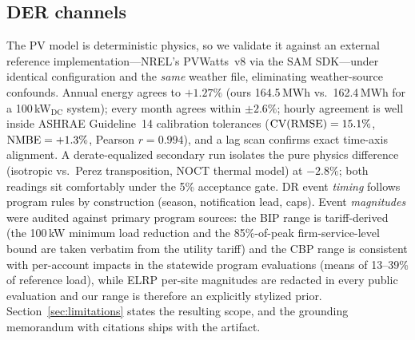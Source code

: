 \subsection{DER channels}
\label{sec:derfidelity}

The PV model is deterministic physics, so we validate it against an external
reference implementation---NREL's PVWatts~v8 via the SAM SDK---under
identical configuration and the \emph{same} weather file, eliminating
weather-source confounds. Annual energy agrees to $+1.27\%$ (ours
164.5\,MWh vs.\ 162.4\,MWh for a 100\,kW$_{\mathrm{DC}}$ system); every
month agrees within $\pm 2.6\%$; hourly agreement is well inside ASHRAE
Guideline~14 calibration tolerances ($\mathrm{CV(RMSE)}{} = 15.1\%$,
$\mathrm{NMBE}{} = +1.3\%$, Pearson $r = 0.994$), and a lag scan confirms exact
time-axis alignment. A derate-equalized secondary run isolates the pure
physics difference (isotropic vs.\ Perez transposition, NOCT thermal model)
at $-2.8\%$; both readings sit comfortably under the 5\% acceptance gate.
DR event \emph{timing} follows program rules by construction (season,
notification lead, caps). Event \emph{magnitudes} were audited against
primary program sources: the BIP range is tariff-derived (the 100\,kW minimum
load reduction and the 85\%-of-peak firm-service-level bound are taken
verbatim from the utility tariff) and the CBP range is consistent with
per-account impacts in the statewide program evaluations (means of
13--39\% of reference load), while ELRP per-site magnitudes are redacted in
every public evaluation and our range is therefore an explicitly stylized
prior. Section~\ref{sec:limitations} states the resulting scope, and the
grounding memorandum with citations ships with the artifact.
